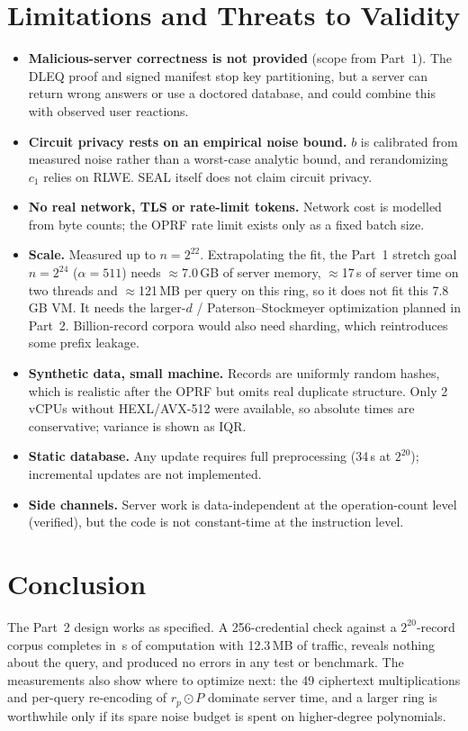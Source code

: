 \documentclass[11pt]{article}
\begin{document}
\section{Limitations and Threats to Validity}
\begin{itemize}[leftmargin=*]
  \item \textbf{Malicious-server correctness is not provided} (scope from Part~1). The DLEQ proof and signed manifest stop key partitioning, but a server can return wrong answers or use a doctored database, and could combine this with observed user reactions.
  \item \textbf{Circuit privacy rests on an empirical noise bound.} $b$ is calibrated from measured noise rather than a worst-case analytic bound, and rerandomizing $c_1$ relies on RLWE. SEAL itself does not claim circuit privacy.
  \item \textbf{No real network, TLS or rate-limit tokens.} Network cost is modelled from byte counts; the OPRF rate limit exists only as a fixed batch size.
  \item \textbf{Scale.} Measured up to $n=2^{22}$. Extrapolating the fit, the Part~1 stretch goal $n=2^{24}$ ($\alpha=511$) needs $\approx$7.0\,GB of server memory, $\approx$17\,s of server time on two threads and $\approx$121\,MB per query on this ring, so it does not fit this 7.8\,GB VM. It needs the larger-$d$ / Paterson--Stockmeyer optimization planned in Part~2. Billion-record corpora would also need sharding, which reintroduces some prefix leakage.
  \item \textbf{Synthetic data, small machine.} Records are uniformly random hashes, which is realistic after the OPRF but omits real duplicate structure. Only 2 vCPUs without HEXL/AVX-512 were available, so absolute times are conservative; variance is shown as IQR.
  \item \textbf{Static database.} Any update requires full preprocessing (34\,s at $2^{20}$); incremental updates are not implemented.
  \item \textbf{Side channels.} Server work is data-independent at the operation-count level (verified), but the code is not constant-time at the instruction level.
\end{itemize}

\section{Conclusion}
The Part~2 design works as specified. A 256-credential check against a $2^{20}$-record corpus completes in \TotMTwo\,s of computation with 12.3\,MB of traffic, reveals nothing about the query, and produced no errors in any test or benchmark. The measurements also show where to optimize next: the 49 ciphertext multiplications and per-query re-encoding of $r_p\odot P$ dominate server time, and a larger ring is worthwhile only if its spare noise budget is spent on higher-degree polynomials.
\end{document}
